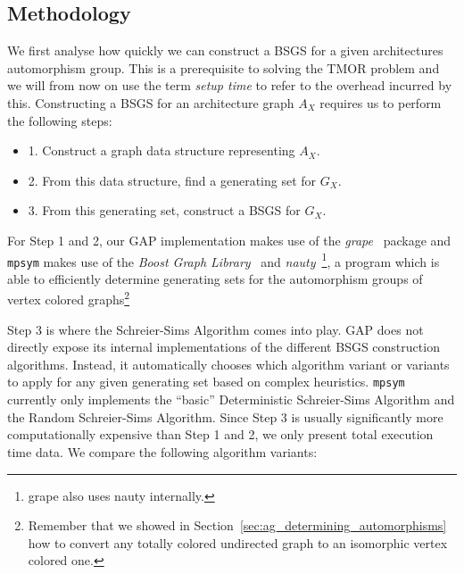 \subsection{Methodology}

We first analyse how quickly we can construct a BSGS for a given architectures
automorphism group. This is a prerequisite to solving the TMOR
problem and we will from now on use the term \textit{setup time} to refer to
the overhead incurred by this. Constructing a BSGS for an architecture
graph $A_X$ requires us to perform the following steps:
%
\begin{itemize}
\item 1. Construct a graph data structure representing $A_X$.
\item 2. From this data structure, find a generating set for $G_X$.
\item 3. From this generating set, construct a BSGS for $G_X$.
\end{itemize}
%
For Step 1 and 2, our GAP implementation makes use of the
\textit{grape}~\cite{grape} package and \texttt{mpsym} makes use of the
\textit{Boost Graph Library}~\cite{BGL} and
\textit{nauty}~\cite{nauty}\footnote{grape also uses nauty internally.}, a
program which is able to efficiently determine generating sets for the
automorphism groups of vertex colored graphs\footnote{Remember that we showed
in Section~\ref{sec:ag_determining_automorphisms} how to convert any totally
colored undirected graph to an isomorphic vertex colored one.}

Step 3 is where the Schreier-Sims Algorithm comes into play. GAP does not
directly expose its internal implementations of the different BSGS construction
algorithms. Instead, it automatically chooses which algorithm variant or
variants to apply for any given generating set based on complex heuristics.
\texttt{mpsym} currently only implements the ``basic'' Deterministic
Schreier-Sims Algorithm and the Random Schreier-Sims Algorithm. Since Step 3
is usually significantly more computationally expensive than Step 1 and 2, we
only present total execution time data.  We compare the following algorithm
variants:

